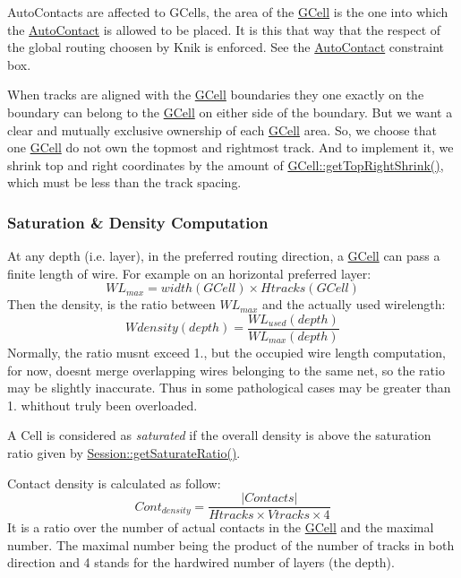 Auto\+Contacts are affected to G\+Cells, the area of the \hyperlink{classKatabatic_1_1GCell}{G\+Cell} is the one into which the \hyperlink{classKatabatic_1_1AutoContact}{Auto\+Contact} is allowed to be placed. It is this that way that the respect of the global routing choosen by Knik is enforced. See the \hyperlink{classKatabatic_1_1AutoContact}{Auto\+Contact} constraint box.

When tracks are aligned with the \hyperlink{classKatabatic_1_1GCell}{G\+Cell} boundaries they one exactly on the boundary can belong to the \hyperlink{classKatabatic_1_1GCell}{G\+Cell} on either side of the boundary. But we want a clear and mutually exclusive ownership of each \hyperlink{classKatabatic_1_1GCell}{G\+Cell} area. So, we choose that one \hyperlink{classKatabatic_1_1GCell}{G\+Cell} do not own the topmost and rightmost track. And to implement it, we shrink top and right coordinates by the amount of \hyperlink{classKatabatic_1_1GCell_ac594cb2832ee7ef410c89499258d38fd}{G\+Cell\+::get\+Top\+Right\+Shrink()}, which must be less than the track spacing.\hypertarget{classKatabatic_1_1GCell_secGCellDensity}{}\subsubsection{Saturation \& Density Computation}\label{classKatabatic_1_1GCell_secGCellDensity}
At any depth (i.\+e. layer), in the preferred routing direction, a \hyperlink{classKatabatic_1_1GCell}{G\+Cell} can pass a finite length of wire. For example on an horizontal preferred layer\+: \[ WL_{max} = width(GCell) \times Htracks(GCell) \] Then the density, is the ratio between $WL_{max}$ and the actually used wirelength\+: \[ Wdensity(depth) = \frac{WL_{used}(depth)}{WL_{max}(depth)} \] Normally, the ratio musn\textquotesingle{}t exceed 1., but the occupied wire length computation, for now, doesn\textquotesingle{}t merge overlapping wires belonging to the same net, so the ratio may be slightly inaccurate. Thus in some pathological cases may be greater than 1. whithout truly been overloaded.

A Cell is considered as {\itshape saturated} if the overall density is above the saturation ratio given by \hyperlink{classKatabatic_1_1Session_a266a4079ca235e8fdb622ef4996d324d}{Session\+::get\+Saturate\+Ratio()}.

Contact density is calculated as follow\+: \[ Cont_{density} = \frac{|Contacts|}{Htracks \times Vtracks \times 4} \] It is a ratio over the number of actual contacts in the \hyperlink{classKatabatic_1_1GCell}{G\+Cell} and the maximal number. The maximal number being the product of the number of tracks in both direction and 4 stands for the hardwired number of layers (the depth).

